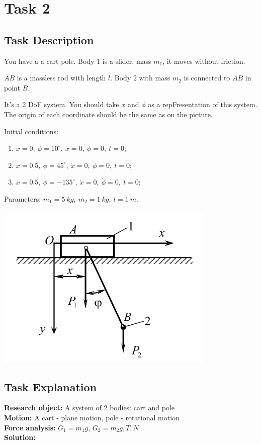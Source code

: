 \documentclass{article}
\begin{document}
\section{Task 2}

\subsection{Task Description}

You have a a cart pole. Body $1$ is a slider, mass $m_1$, it moves without friction.

$AB$ is a massless rod with length $l$. Body $2$ with mass $m_2$ is connected to $AB$ in point $B$.
\medskip

It's a 2 DoF system. You should take $x$ and $\phi$ as a repFresentation of this system. The origin of each coordinate should be the same as on the picture.
\medskip

Initial conditions:
\begin{enumerate}
  \item $x = 0,\ \phi = 10^\circ,\ \dot{x} = 0,\ \dot{\phi} = 0,\ t=0$;
  \item $x = 0.5,\ \phi = 45^\circ,\ \dot{x} = 0,\ \dot{\phi} = 0,\ t=0$;
  \item $x = 0.5,\ \phi = -135^\circ,\ \dot{x} = 0,\ \dot{\phi} = 0,\ t=0$;
\end{enumerate}
Parameters: $m_1 = 5\ kg,\ m_2 = 1\ kg,\ l = 1\ m$.

\includegraphics[scale=0.5]{hw8_task2.png}

\subsection{Task Explanation}

\textbf{Research object:} A system of 2 bodies: cart and pole\\
\textbf{Motion:} A cart - plane motion, pole - rotational motion\\
\textbf{Force analysis:} $G_1 = m_1 g$, $G_2 = m_2 g, T, N$\\
\textbf{Solution:}
\end{document}
